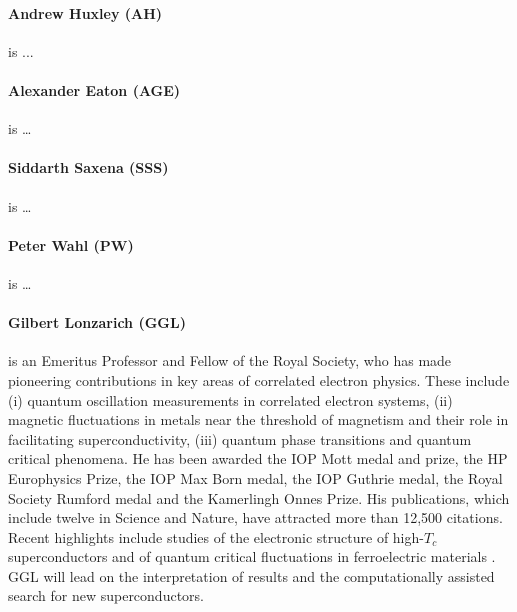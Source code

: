 

\paragraph{Andrew Huxley (AH)}
is ...

\paragraph{Alexander Eaton (AGE)}
is \dots

\paragraph{Siddarth Saxena (SSS)}
is \dots

\paragraph{Peter Wahl (PW)}
is \dots

\paragraph{Gilbert Lonzarich (GGL)}
is an Emeritus Professor and Fellow of the Royal Society, who has
made pioneering contributions in key areas of correlated electron
physics. These include (i) quantum oscillation measurements
in correlated electron systems, (ii) magnetic fluctuations in metals near the threshold of magnetism and their role in facilitating superconductivity, (iii) quantum phase transitions and quantum critical phenomena. 
He has been awarded the IOP Mott
medal and prize, the HP Europhysics Prize, the IOP Max Born medal, the
IOP Guthrie medal, the Royal Society Rumford medal and the Kamerlingh Onnes Prize. His publications, which include twelve in
Science and Nature, have
attracted more than 12,500 citations. Recent highlights
include studies of %
the electronic structure
of high-$T_c$ superconductors
 and %
of quantum critical fluctuations in
ferroelectric materials . GGL will lead on the interpretation of results and the computationally assisted search for new superconductors.

